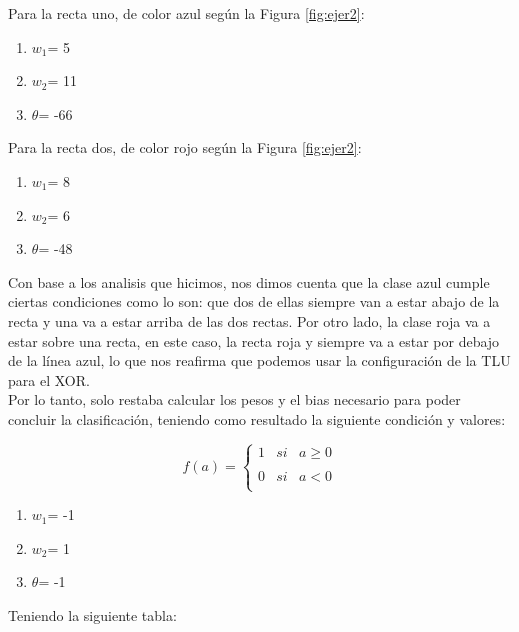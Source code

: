 \documentclass[12pt,twoside]{article}
\begin{document}
Para la recta uno, de color azul según la Figura \ref{fig:ejer2}:
\begin{enumerate}
    \item \textbf{$w_{1}$}= 5
    \item \textbf{$w_{2}$}= 11 
    \item \textbf{$\theta$}= -66 
\end{enumerate}

Para la recta dos, de color rojo según la Figura \ref{fig:ejer2}:

\begin{enumerate}
    \item \textbf{$w_{1}$}= 8
    \item \textbf{$w_{2}$}= 6 
    \item \textbf{$\theta$}= -48 
\end{enumerate}


Con base a los analisis que hicimos, nos dimos cuenta que la clase azul
cumple ciertas condiciones como lo son: que dos de ellas siempre van a 
estar abajo de la recta y una va a estar arriba de las dos rectas. Por otro
lado, la clase roja va a estar sobre una recta, en este caso, la recta roja 
y siempre va a estar por debajo de la línea azul, lo que nos reafirma que
podemos usar la configuración de la TLU para el XOR.\\

Por lo tanto, solo restaba calcular los pesos y el bias necesario para 
poder concluir la clasificación, teniendo como resultado la siguiente condición y
valores:

\begin{equation}
    f(a) = \left\{ \begin{array}{lcc}
        1 &   si  & a \geq 0 \\
        \\0 &  si & a < 0 \\
        \end{array}
    \right.
\end{equation}

\begin{enumerate}
    \item \textbf{$w_{1}$}= -1
    \item \textbf{$w_{2}$}= 1
    \item \textbf{$\theta$}= -1 
\end{enumerate}

Teniendo la siguiente tabla:
\end{document}
